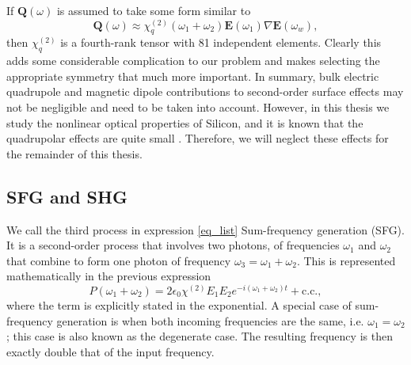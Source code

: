 If $\mathbf{Q}(\omega)$ is assumed to take some form similar to
\begin{equation}
\mathbf{Q}(\omega) \approx \chi^{(2)}_{q}(\omega_{1}
+ \omega_{2})\mathbf{E}(\omega_{1})\nabla\mathbf{E}(\omega_{w}),
\end{equation}
then $\chi^{(2)}_{q}$ is a fourth-rank tensor with 81 independent elements.
Clearly this adds some considerable complication to our problem and makes
selecting the appropriate symmetry that much more important. In summary, bulk
electric quadrupole and magnetic dipole contributions to second-order surface
effects may not be negligible and need to be taken into account. However, in
this thesis we study the nonlinear optical properties of Silicon, and it is
known that the quadrupolar effects are quite small \cite{aktsipetrovJETP86,
sipePRB87, xuJVST97, guyotPRB88, downerSIA01, shenAPB99}. Therefore, we will
neglect these effects for the remainder of this thesis.



\subsection{SFG and SHG}\label{chap_theory_sum}

We call the third process in expression \eqref{eq_list} Sum-frequency generation
(SFG). It is a second-order process that involves two photons, of frequencies
$\omega_{1}$ and $\omega_{2}$ that combine to form one photon of frequency
$\omega_{3} = \omega_{1} + \omega_{2}$. This is represented mathematically in
the previous expression
\begin{equation}
P(\omega_{1}+\omega_{2})
= 2\epsilon_{0}\chi^{(2)}E_{1}E_{2}e^{-i(\omega_{1}+\omega_{2})t} + \text{c.c.},
\end{equation}
where the term is explicitly stated in the exponential. A special case of
sum-frequency generation is when both incoming frequencies are the same, i.e.
$\omega_{1} = \omega_{2}$; this case is also known as the degenerate case. The
resulting frequency is then exactly double that of the input frequency.


